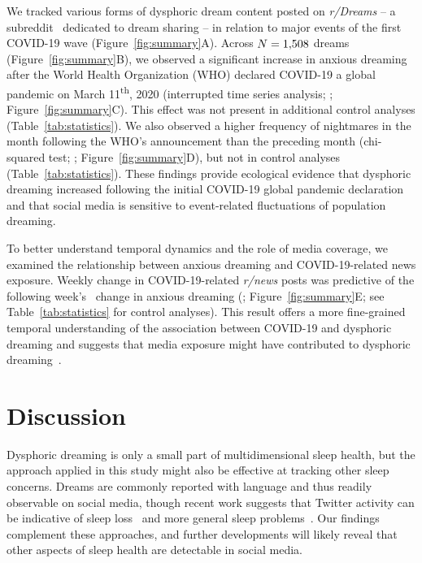 \documentclass[11pt,a4paper,twocolumn]{article}
\begin{document}
We tracked various forms of dysphoric dream content posted on \textit{r/Dreams} -- a subreddit~\supercite{proferes2021studying} dedicated to dream sharing -- in relation to major events of the first COVID-19 wave (Figure~\ref{fig:summary}A). Across $N = 1{,}508$ dreams (Figure~\ref{fig:summary}B), we observed a significant increase in anxious dreaming after the World Health Organization (WHO) declared COVID-19 a global pandemic on March 11\textsuperscript{th}, 2020 (interrupted time series analysis; \regrResult; Figure~\ref{fig:summary}C). This effect was not present in additional control analyses (Table~\ref{tab:statistics}). We also observed a higher frequency of nightmares in the month following the WHO's announcement than the preceding month (chi-squared test; \chiResult; Figure~\ref{fig:summary}D), but not in control analyses (Table~\ref{tab:statistics}). These findings provide ecological evidence that dysphoric dreaming increased following the initial COVID-19 global pandemic declaration and that social media is sensitive to event-related fluctuations of population dreaming.

\par
To better understand temporal dynamics and the role of media coverage, we examined the relationship between anxious dreaming and COVID-19-related news exposure. Weekly change in COVID-19-related \textit{r/news} posts was predictive of the following week's~\supercite{picard2022targeted} change in anxious dreaming (\corrResult; Figure~\ref{fig:summary}E; see Table~\ref{tab:statistics} for control analyses). This result offers a more fine-grained temporal understanding of the association between COVID-19 and dysphoric dreaming and suggests that media exposure might have contributed to dysphoric dreaming~\supercite{holman2014media}.

\vfill
\section*{Discussion}

Dysphoric dreaming is only a small part of multidimensional sleep health, but the approach applied in this study might also be effective at tracking other sleep concerns. Dreams are commonly reported with language and thus readily observable on social media, though recent work suggests that Twitter activity can be indicative of sleep loss~\supercite{leypunskiy2018geographically,linnell2021sleep} and more general sleep problems~\supercite{mciver2015characterizing}. Our findings complement these approaches, and further developments will likely reveal that other aspects of sleep health are detectable in social media.
\end{document}
